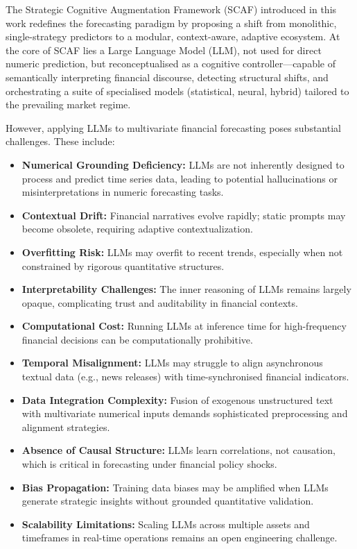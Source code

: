 \documentclass[conference]{IEEEtran}
\begin{document}
The Strategic Cognitive Augmentation Framework (SCAF) introduced in this work redefines the forecasting paradigm by proposing a shift from monolithic, single-strategy predictors to a modular, context-aware, adaptive ecosystem. At the core of SCAF lies a Large Language Model (LLM), not used for direct numeric prediction, but reconceptualised as a cognitive controller—capable of semantically interpreting financial discourse, detecting structural shifts, and orchestrating a suite of specialised models (statistical, neural, hybrid) tailored to the prevailing market regime.

However, applying LLMs to multivariate financial forecasting poses substantial challenges. These include:
\begin{itemize}
    \item \textbf{Numerical Grounding Deficiency:} LLMs are not inherently designed to process and predict time series data, leading to potential hallucinations or misinterpretations in numeric forecasting tasks.
    \item \textbf{Contextual Drift:} Financial narratives evolve rapidly; static prompts may become obsolete, requiring adaptive contextualization.
    \item \textbf{Overfitting Risk:} LLMs may overfit to recent trends, especially when not constrained by rigorous quantitative structures.
    \item \textbf{Interpretability Challenges:} The inner reasoning of LLMs remains largely opaque, complicating trust and auditability in financial contexts.
    \item \textbf{Computational Cost:} Running LLMs at inference time for high-frequency financial decisions can be computationally prohibitive.
    \item \textbf{Temporal Misalignment:} LLMs may struggle to align asynchronous textual data (e.g., news releases) with time-synchronised financial indicators.
    \item \textbf{Data Integration Complexity:} Fusion of exogenous unstructured text with multivariate numerical inputs demands sophisticated preprocessing and alignment strategies.
    \item \textbf{Absence of Causal Structure:} LLMs learn correlations, not causation, which is critical in forecasting under financial policy shocks.
    \item \textbf{Bias Propagation:} Training data biases may be amplified when LLMs generate strategic insights without grounded quantitative validation.
    \item \textbf{Scalability Limitations:} Scaling LLMs across multiple assets and timeframes in real-time operations remains an open engineering challenge.
\end{itemize}
\end{document}
